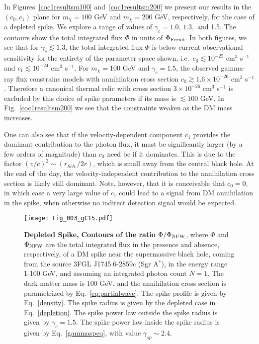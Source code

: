 \documentclass[11pt]{article}
\begin{document}
In Figures~\ref{coc1resultsm100} and~\ref{coc1resultsm200} we present our results in the $(c_0,c_1)$ plane for  $m_\chi=100$ GeV and  $m_\chi=200$ GeV, respectively, for the case of a depleted spike.  We explore a range of values of $\gamma_c = 1.0, \, 1.3,$ and 1.5. The contours show the total integrated flux $\Phi$ in units of  $\Phi_{\rm Fermi}$. In both figures, we see that for $\gamma_c \lesssim 1.3$, the total integrated flux $\Phi$ is below current observational sensitivity for the entirety of the parameter space shown, i.e.~$c_0 \lesssim 10^{-25}$ cm$^{3}$ s$^{-1}$ and $c_1 \lesssim 10^{-24}$ cm$^{3}$ s$^{-1}$. For $m_\chi=100$ GeV and $\gamma_c = 1.5$, the observed gamma-ray flux constrains models with annihilation cross section $c_0 \gtrsim 1.6 \times 10^{-26}$ cm$^{3}$ s$^{-1}$. Therefore a canonical thermal relic with cross section $3 \times 10^{-26}$ cm$^{3}$ s$^{-1}$ is excluded by this choice of spike parameters if its mass is $\lesssim100$ GeV.  In Fig.~\ref{coc1resultsm200} we see that the constraints weaken as the DM mass increases.

One can also see that if the velocity-dependent component $c_1$ provides the dominant contribution to the photon flux, it must be significantly larger (by a few orders of magnitude) than $c_0$ need be if it dominates. This is due to the factor $(v/c)^2 \sim (r_{Sch.}/2r)$, which is small away from the central black hole.  At the end of the day, the velocity-independent contribution to the annihilation cross section is likely still dominant.  Note, however, that it is conceivable that $c_0=0$, in which case a very large value of $c_1$ could lead to a signal from DM annihilation in the spike, when otherwise no indirect detection signal would be expected.


   \begin{figure}[ht]
  \centering
  {\texttt{[image: Fig\_003\_gC15.pdf]}}
    \caption{\textbf{Depleted Spike,} \textbf{Contours of the ratio $\Phi/\Phi_{\rm{NFW}}$}, where $\Phi$ and $\Phi_{\rm{NFW}}$ are the total integrated flux in the presence and absence, respectively, of a DM spike near the supermassive black hole, coming from the source 3FGL J1745.6-2859c (Sgr A$^*$), in the energy range 1-100 GeV, and assuming an integrated photon count $N=1$. The dark matter mass is 100 GeV, and the annihilation cross section is parametrized by Eq.~\ref{eq:partialwave}. The spike profile is given by Eq.~\ref{density}. The spike radius is given by the depleted case in Eq.~\ref{depletion}. The spike power law  outside the spike radius is given by $\gamma_c  = 1.5$. The spike power law inside the spike radius is given by Eq.~\ref{gammaspeq}, with value $\gamma_{sp} \sim 2.4$.}
    \label{fluxcomparednfw}
\end{figure}
\end{document}
